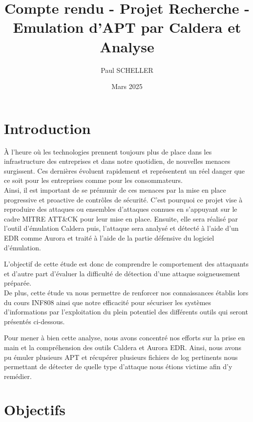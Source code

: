 \documentclass[12pt,letterpaper]{article}
\title{Compte rendu - Projet Recherche - Emulation d'APT par Caldera et Analyse}
\author{Paul SCHELLER}
\date{Mars 2025}
\begin{document}



\newpage
\renewcommand{\contentsname}{Plan de l'étude}
\tableofcontents


\newpage
\section{Introduction}

À l'heure où les technologies prennent toujours plus de place dans les infrastructure des entreprises et dans notre quotidien, de nouvelles menaces surgissent. Ces dernières évoluent rapidement et représentent un réel danger que ce soit pour les entreprises comme pour les consommateurs. \\
Ainsi, il est important de se prémunir de ces menaces par la mise en place progressive et proactive de contrôles de sécurité. C'est pourquoi ce projet vise à reproduire des attaques ou ensembles d'attaques connues en s'appuyant sur le cadre MITRE ATT\&CK pour leur mise en place. Ensuite, elle sera réalisé par l'outil d'émulation Caldera puis, l'attaque sera analysé et détecté à l'aide d'un EDR comme Aurora et traité à l'aide de la partie défensive du logiciel d'émulation.

\bigskip

L'objectif de cette étude est donc de comprendre le comportement des attaquants et d'autre part d'évaluer la difficulté de détection d'une attaque soigneusement préparée. \\
De plus, cette étude va nous permettre de renforcer nos connaissances établis lors du cours INF808 ainsi que notre efficacité pour sécuriser les systèmes d'informations par l'exploitation du plein potentiel des différents outils qui seront présentés ci-dessous.

\bigskip

Pour mener à bien cette analyse, nous avons concentré nos efforts sur la prise en main et la compréhension des outils Caldera et Aurora EDR. Ainsi, nous avons pu émuler plusieurs APT et récupérer plusieurs fichiers de log pertinents nous permettant de détecter de quelle type d'attaque nous étions victime afin d'y remédier.

\newpage
\section{Objectifs}
\end{document}
